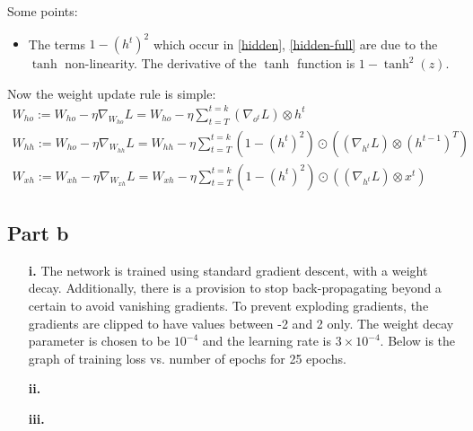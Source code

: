 \documentclass{article}
\newcommand{\G}{\nabla}
\begin{document}
\begin{flushleft}
\begin{itemize}
Some points:
\begin{itemize}
\item The terms \(1 - (h^{t})^{2}\) which occur in \ref{hidden}, \ref{hidden-full} are due to the \(\tanh\) non-linearity. The derivative of the \(\tanh\) function is \(1 - \tanh^{2}(z)\).
\end{itemize}

Now the weight update rule is simple:
\begin{gather}
\displaystyle W_{ho} := W_{ho} - \eta \G_{W_{ho}}L = W_{ho} - \eta \sum_{t=T}^{t=k} (\G_{o^{t}} L) \otimes h^{t} \\
\displaystyle W_{hh} := W_{ho} - \eta \G_{W_{hh}}L = W_{hh} - \eta \sum_{t=T}^{t=k} (1 - (h^{t})^{2}) \odot \left((\G_{h^{t}} L) \otimes (h^{t-1})^{T}\right) \\
\displaystyle W_{xh} := W_{xh} - \eta \G_{W_{xh}}L = W_{xh} - \eta \sum_{t=T}^{t=k} (1 - (h^{t})^{2}) \odot \left((\G_{h^{t}} L) \otimes x^{t}\right)
\end{gather}
\end{itemize}
\end{flushleft}

\subsection*{Part b}
\begin{flushleft}
\begin{itemize}
\item [\textbf{i.}] The network is trained using standard gradient descent, with a weight decay. Additionally, there is a provision to stop back-propagating beyond a certain to avoid vanishing gradients. To prevent exploding gradients, the gradients are clipped to have values between -2 and 2 only. The weight decay parameter is chosen to be \(10^{-4}\) and the learning rate is \(3\times 10^{-4}\). Below is the graph of training loss vs. number of epochs for 25 epochs.

\item [\textbf{ii.}]
\item [\textbf{iii.}]
\end{itemize}
\end{flushleft}
\end{document}
